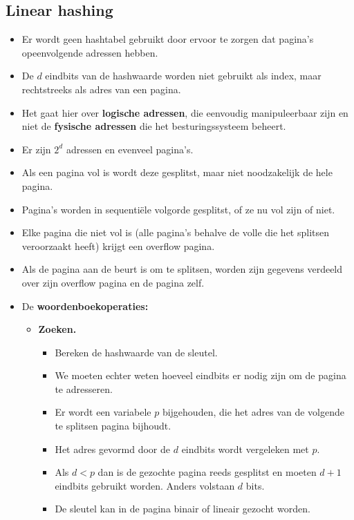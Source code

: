\subsection{Linear hashing}
\begin{itemize}
    \item Er wordt geen hashtabel gebruikt door ervoor te zorgen dat pagina's opeenvolgende adressen hebben.
    \item De $d$ eindbits van de hashwaarde worden niet gebruikt als index, maar rechtstreeks als adres van een pagina.
    \item Het gaat hier over \textbf{logische adressen}, die eenvoudig manipuleerbaar zijn en niet de \textbf{fysische adressen} die het besturingssysteem beheert.
    \item Er zijn $2^d$ adressen en evenveel pagina's.
    \item Als een pagina vol is wordt deze gesplitst, maar niet noodzakelijk de hele pagina.
    \item Pagina's worden in sequentiële volgorde gesplitst, of ze nu vol zijn of niet.
    \item Elke pagina die niet vol is (alle pagina's behalve de volle die het splitsen veroorzaakt heeft) krijgt een overflow pagina.
    \item Als de pagina aan de beurt is om te splitsen, worden zijn gegevens verdeeld over zijn overflow pagina en de pagina zelf.
    \item De \textbf{woordenboekoperaties:} 
    \begin{itemize}
        \item \textbf{Zoeken.}
        \begin{itemize}
            \item Bereken de hashwaarde van de sleutel.
            \item We moeten echter weten hoeveel eindbits er nodig zijn om de pagina te adresseren.
            \item Er wordt een variabele $p$ bijgehouden, die het adres van de volgende te splitsen pagina bijhoudt.
            \item Het adres gevormd door de $d$ eindbits wordt vergeleken met $p$. 
            \item Als $d < p$ dan is de gezochte pagina reeds gesplitst en moeten $d + 1$ eindbits gebruikt worden. Anders volstaan $d$ bits.
            \item De sleutel kan in de pagina binair of lineair gezocht worden.
        \end{itemize}

\end{itemize}
\end{itemize}
